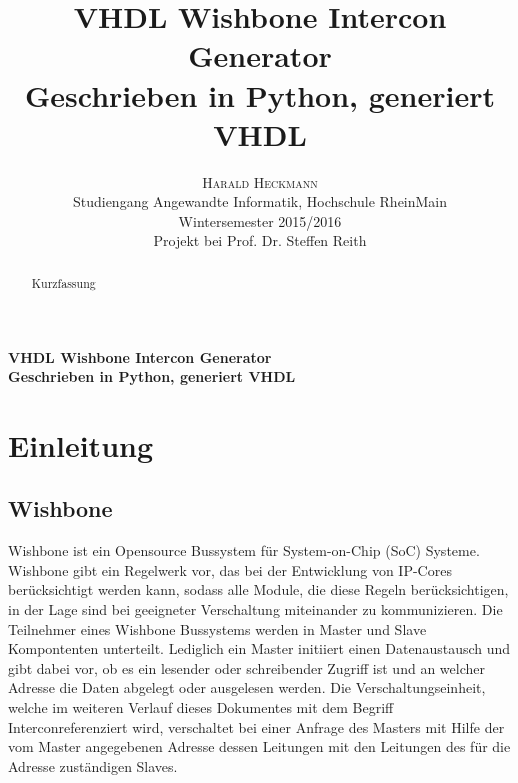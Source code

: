 \documentclass{article}
\title{\vspace{-3mm}%
	\fontsize{24pt}{10pt}\selectfont
	\textbf{VHDL Wishbone Intercon Generator} \\
	\textbf{Geschrieben in Python, generiert VHDL}
	}
\author{%
	\large
	\textsc{Harald Heckmann} \\[2mm]
	\normalsize	Studiengang Angewandte Informatik, Hochschule RheinMain \\
	\normalsize	Wintersemester 2015/2016 \\
	\normalsize	Projekt bei Prof. Dr. Steffen Reith \\
	\vspace{-5mm}
	}
\date{}
\begin{document}

\maketitle
\newpage




\begin{center}
\textbf{VHDL Wishbone Intercon Generator} \\
\textbf{Geschrieben in Python, generiert VHDL}
\end{center}

\begin{abstract}
Kurzfassung
\end{abstract}
\newpage
\tableofcontents
\newpage


\section{Einleitung}
\subsection{Wishbone}
Wishbone ist ein Opensource Bussystem für System-on-Chip (SoC) Systeme.
Wishbone gibt ein Regelwerk vor, das bei der Entwicklung von IP-Cores
berücksichtigt werden kann, sodass alle Module, die diese Regeln berücksichtigen,
in der Lage sind bei geeigneter Verschaltung miteinander zu kommunizieren.
Die Teilnehmer eines Wishbone Bussystems werden in Master und Slave Kompontenten
unterteilt. Lediglich ein Master initiiert einen Datenaustausch und 
gibt dabei vor, ob es ein lesender oder schreibender Zugriff ist und an welcher Adresse
die Daten abgelegt oder ausgelesen werden. %
Die Verschaltungseinheit, welche im weiteren Verlauf dieses Dokumentes mit dem Begriff \glqq Intercon\grqq referenziert wird, verschaltet bei einer Anfrage des Masters mit Hilfe der vom Master angegebenen Adresse 
dessen Leitungen mit den Leitungen des für die Adresse zuständigen Slaves.
\end{document}
